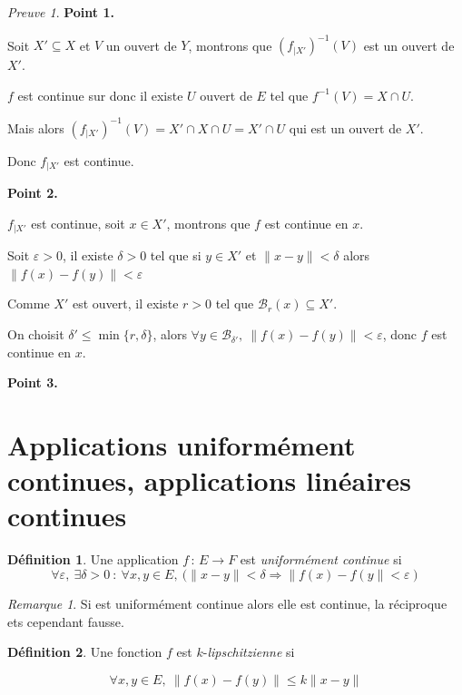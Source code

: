 \documentclass[]{article}
\theoremstyle{remark}
\newtheorem{myrem}{Remarque}
\newtheorem{myproof}{Preuve}
\theoremstyle{definition}
\newtheorem{mydef}{Définition}
\newcommand{\funcshort}[3]{
#1 \, : \, #2 \longrightarrow #3
}
\newenvironment{proofpart}[1]{
	\noindent
	{\textbf{\boldmath #1}}
}{
	\checkmark
}
\begin{document}
\begin{myproof}
	\begin{proofpart}{Point 1.}
		Soit $X' \subseteq X$ et $V$ un ouvert de $Y$, montrons que $\left(f_{|X'}\right)^{-1}(V)$ est un ouvert de $X'$.
		
		$f$ est continue sur donc il existe $U$ ouvert de $E$ tel que $f^{-1}(V)= X \cap U$.
		
		Mais alors $\left(f_{|X'}\right)^{-1}(V) = X' \cap X \cap U = X' \cap U$ qui est un ouvert de $X'$.
		
		Donc $f_{|X'}$ est continue.
	\end{proofpart}
	
	\begin{proofpart}{Point 2.}
		$f_{|X'}$ est continue, soit $x \in X'$, montrons que $f$ est continue en $x$.
		
		Soit $\varepsilon > 0$, il existe $\delta
		 > 0$ tel que si $y \in X'$ et $\|x-y\| < \delta$ alors $\|f(x)-f(y)\| < \varepsilon$
		 
		 Comme $X'$ est ouvert, il existe $r > 0$ tel que $\mathcal{B}_r(x) \subseteq X'$.
		 
		 On choisit $\delta' \leqslant \min\{r, \delta\}$, alors $\forall y \in \mathcal{B}_{\delta'}, ~ \|f(x)-f(y)\| < \varepsilon$, donc $f$ est continue en $x$.
	\end{proofpart}
	
	\begin{proofpart}{Point 3.}
	\end{proofpart}
\end{myproof}


\section{Applications uniformément continues, applications linéaires continues}

\begin{mydef}
	Une application $\funcshort{f}{E}{F}$ est \textit{uniformément continue} si $$\forall \varepsilon, ~ \exists \delta > 0 ~ : ~ \forall x, y \in E, ~ (\|x-y\| < \delta \Longrightarrow \|f(x)-f(y\| < \varepsilon)$$
\end{mydef}

\begin{myrem}
	Si est uniformément continue alors elle est continue, la réciproque ets cependant fausse.
\end{myrem}

\begin{mydef}
	Une fonction $f$ est $k$-\textit{lipschitzienne} si
	
	$$\forall x, y \in E, ~ \|f(x)-f(y)\| \leqslant k \|x-y\|$$
\end{mydef}
\end{document}
